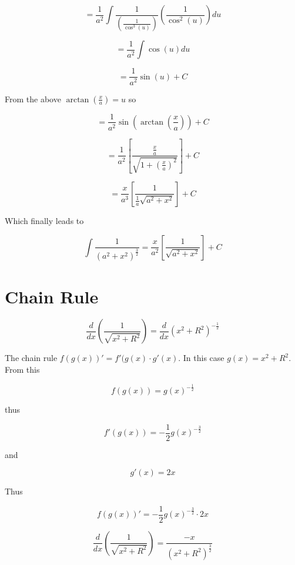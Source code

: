 \documentclass[14pt]{memoir}
\begin{document}
\begin{equation}
=  \frac{1}{a^2} \int \frac{1}{(\frac{1}{\cos^3(u)})} ( \frac{1}{\cos^2{(u)}}) du
\end{equation}

\begin{equation}
=  \frac{1}{a^2} \int \cos{(u)} du
\end{equation}

\begin{equation}
=  \frac{1}{a^2} \sin{(u)} + C
\end{equation}


From the above $\arctan{(\frac{x}{a})} = u$ so

\begin{equation}
=  \frac{1}{a^2} \sin{(\arctan{(\frac{x}{a})})} + C
\end{equation}

\begin{equation}
=  \frac{1}{a^2} [\frac{\frac{x}{a}}{\sqrt{1+(\frac{x}{a})^2}}] + C
\end{equation}

\begin{equation}
=  \frac{x}{a^3} [\frac{1}{\frac{1}{a} \sqrt{a^2+x^2}}] + C
\end{equation}

Which finally leads to

\begin{equation}
\int \frac{1}{(a^2 + x^2)^{\frac{3}{2}}} =  \frac{x}{a^2} [\frac{1}{\sqrt{a^2+x^2}}] + C
\end{equation}

\chapter{Chain Rule}

\begin{equation}
\frac{d}{dx} (\frac{1}{\sqrt{x^2+R^2}}) = \frac{d}{dx} (x^2+R^2)^{-\frac{1}{2}} 
\end{equation}

The chain rule $ f(g(x))' = f'(g(x) \cdot g'(x)$. In this case $g(x) = x^2 + R^2$. From this

\begin{equation}
f(g(x)) = g(x)^{-\frac{1}{2}} 
\end{equation}

thus  

\begin{equation}
f'(g(x)) = -\frac{1}{2} g(x)^{-\frac{3}{2}} 
\end{equation}

and

\begin{equation}
g'(x) = 2x
\end{equation}

Thus

\begin{equation}
f(g(x))' =  -\frac{1}{2} g(x)^{-\frac{3}{2}}  \cdot 2x
\end{equation}

\begin{equation}
\frac{d}{dx} (\frac{1}{\sqrt{x^2+R^2}}) = \frac{-x}{(x^2 + R^2)^\frac{3}{2}}
\end{equation}
\end{document}
